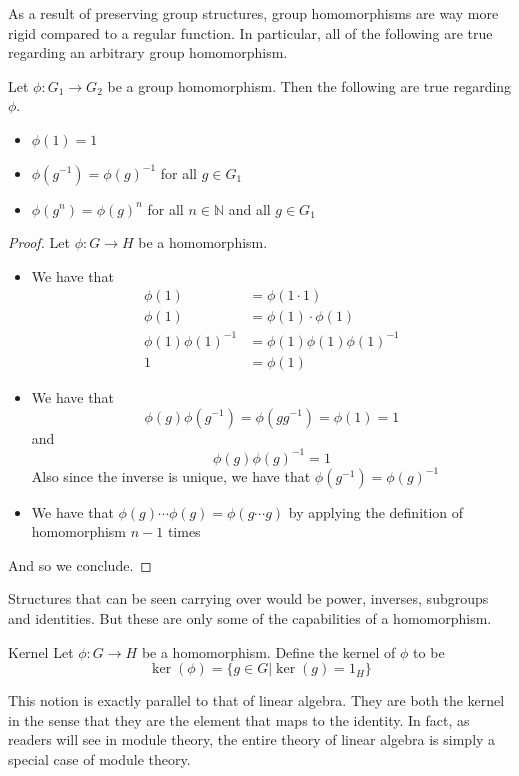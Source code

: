 \documentclass[a4paper]{article}
\begin{document}
As a result of preserving group structures, group homomorphisms are way more rigid compared to a regular function. In particular, all of the following are true regarding an arbitrary group homomorphism. 

\begin{prp}{}{} Let $\phi:G_1\to G_2$ be a group homomorphism. Then the following are true regarding $\phi$. 
\begin{itemize}
\item $\phi(1)=1$
\item $\phi(g^{-1})=\phi(g)^{-1}$ for all $g\in G_1$
\item $\phi(g^n)=\phi(g)^n$ for all $n\in\mathbb{N}$ and all $g\in G_1$
\end{itemize}
\begin{proof} Let $\phi:G\to H$ be a homomorphism. 
\begin{itemize}
\item We have that 
\begin{align*}
\phi(1)&=\phi(1\cdot 1)\\
\phi(1)&=\phi(1)\cdot\phi(1)\\
\phi(1)\phi(1)^{-1}&=\phi(1)\phi(1)\phi(1)^{-1}\\
1&=\phi(1)
\end{align*}
\item We have that $$\phi(g)\phi(g^{-1})=\phi(gg^{-1})=\phi(1)=1$$ and $$\phi(g)\phi(g)^{-1}=1$$ Also since the inverse is unique, we have that $\phi(g^{-1})=\phi(g)^{-1}$
\item We have that $\phi(g)\cdots\phi(g)=\phi(g\cdots g)$ by applying the definition of homomorphism $n-1$ times
\end{itemize}
And so we conclude. 
\end{proof}
\end{prp}

Structures that can be seen carrying over would be power, inverses, subgroups and identities. But these are only some of the capabilities of a homomorphism. 

\begin{defn}{Kernel}{} Let $\phi:G\to H$ be a homomorphism. Define the kernel of $\phi$ to be $$\ker(\phi)=\{g\in G|\ker(g)=1_H\}$$
\end{defn}

This notion is exactly parallel to that of linear algebra. They are both the kernel in the sense that they are the element that maps to the identity. In fact, as readers will see in module theory, the entire theory of linear algebra is simply a special case of module theory. 
\end{document}
